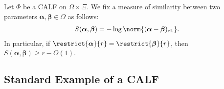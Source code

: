 \begin{definition}
    Let $\Phi$ be a CALF on $\Omega \times \Xi$. We fix a measure of similarity between two parameters $\boldsymbol{\alpha}, \boldsymbol{\beta} \in \Omega$ as follows:
    \begin{align*}
        S(\boldsymbol{\alpha}, \boldsymbol{\beta}) = -\log \norm{(\boldsymbol{\alpha} - \boldsymbol{\beta})_{\operatorname{cL}}}.
    \end{align*}
    In particular, if $\restrict{\boldsymbol{\alpha}}{r} = \restrict{\boldsymbol{\beta}}{r}$, then $S(\boldsymbol{\alpha}, \boldsymbol{\beta}) \geq r - O(1)$. 
\end{definition}

\subsection{Standard Example of a CALF}

